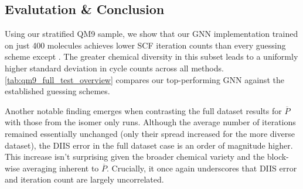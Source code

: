 \subsection{Evalutation \& Conclusion}
\label{sec:qm9_full_isomers_conclusion}
Using our stratified QM9 sample, we show that our GNN implementation trained on just 400 molecules achieves lower SCF iteration counts than every guessing scheme except . The greater chemical diversity in this subset leads to a uniformly higher standard deviation in cycle counts across all methods. \autoref{tab:qm9_full_test_overview} compares our top-performing GNN against the established guessing schemes.

Another notable finding emerges when contrasting the full dataset results for $\overline{P}$ with those from the isomer only runs. Although the average number of iterations remained essentially unchanged (only their spread increased for the more diverse dataset), the DIIS error in the full dataset case is an order of magnitude higher. This increase isn't surprising given the broader chemical variety and the block-wise averaging inherent to $\overline{P}$. Crucially, it once again underscores that DIIS error and iteration count are largely uncorrelated.
